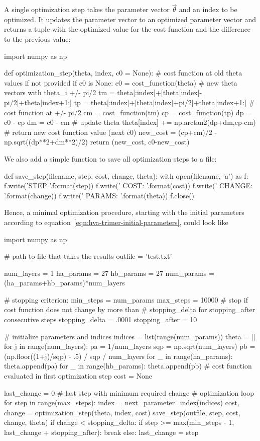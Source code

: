 \documentclass[a4paper,12pt]{article}
\begin{document}
A single optimization step takes the parameter vector $\vec\theta$ and an index to be optimized. It updates the parameter vector to an optimized parameter vector and returns a tuple with the optimized value for the cost function and the difference to the previous value:
\begin{python}
import numpy as np

def optimization_step(theta, index, c0 = None):
    # cost function at old theta values if not provided
    if c0 is None:
        c0 = cost_function(theta)
    # new theta vectors with theta_i +/- pi/2
    tm = theta[:index]+[theta[index]-pi/2]+theta[index+1:]
    tp = theta[:index]+[theta[index]+pi/2]+theta[index+1:]
    # cost function at +/- pi/2
    cm = cost_function(tm)
    cp = cost_function(tp)
    dp = c0 - cp
    dm = c0 - cm
    # update theta
    theta[index] += np.arctan2(dp+dm,cp-cm)
    # return new cost function value (next c0)
    new_cost = (cp+cm)/2 - np.sqrt((dp**2+dm**2)/2)
    return (new_cost, c0-new_cost)
\end{python}
We also add a simple function to save all optimization steps to a file:
\begin{python}
def save_step(filename, step, cost, change, theta):
    with open(filename, 'a') as f:
        f.write('STEP {}'.format(step))
        f.write('  COST:   {}'.format(cost))
        f.write('  CHANGE: {}'.format(change))
        f.write('  PARAMS: {}'.format(theta))
        f.close()
\end{python}
Hence, a minimal optimization procedure, starting with the initial parameters according to equation~\eqref{eqn:hva-trimer-initial-parameters}, could look like
\begin{python}
import numpy as np

# path to file that takes the results
outfile = 'test.txt'

num_layers = 1
ha_params  = 27
hb_params  = 27
num_params = (ha_params+hb_params)*num_layers

# stopping criterion:
min_steps = num_params
max_steps = 10000
# stop if cost function does not change by more than
# stopping_delta for stopping_after consecutive steps
stopping_delta = .0001
stopping_after = 10

# initialize parameters and indices
indices = list(range(num_params))
theta = []
for j in range(num_layers):
    pa = 1/num_layers
    sqp = np.sqrt(num_layers)
    pb = (np.floor((1+j)/sqp) - .5) / sqp / num_layers
    for _ in range(ha_params):
        theta.append(pa)
    for _ in range(hb_params):
        theta.append(pb)
# cost function evaluated in first optimization step
cost = None

last_change = 0 # last step with minimum required change
# optimization loop
for step in range(max_steps):
    index = next_parameter_index(indices)
    cost, change = optimization_step(theta, index, cost)
    save_step(outfile, step, cost, change, theta)
    if change < stopping_delta:
        if step >= max(min_steps - 1,
                       last_change + stopping_after):
            break
    else:
        last_change = step
\end{python}
\end{document}
